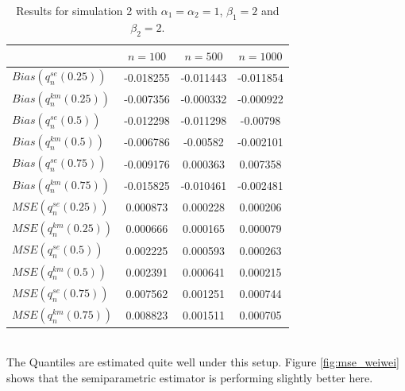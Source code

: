 \begin{table}[h!]
	\begin{center}
		\begin{tabular}{| l || c | c | c |}
			\hline
			&       $n=100$   &    $n=500$    &    $n=1000$\\
			\hline
			\hline
			$Bias(q^{se}_n(0.25)) $ & -0.018255 & -0.011443 & -0.011854\\
			$Bias(q^{km}_n(0.25)) $ & -0.007356 & -0.000332 & -0.000922\\
			\hline
			$Bias(q^{se}_n(0.5)) $ & -0.012298 & -0.011298 & -0.00798\\
			$Bias(q^{km}_n(0.5))$ & -0.006786 & -0.00582 & -0.002101\\
			\hline
			$Bias(q^{se}_n(0.75))$ & -0.009176 & 0.000363 & 0.007358\\
			$Bias(q^{km}_n(0.75))$ & -0.015825 & -0.010461 & -0.002481\\
			\hline
			\hline
			$MSE(q^{se}_n(0.25))$ & 0.000873 & 0.000228 & 0.000206\\
			$MSE(q^{km}_n(0.25))$ & 0.000666 & 0.000165 & 0.000079\\
			\hline
			$MSE(q^{se}_n(0.5))$ & 0.002225 & 0.000593 & 0.000263\\
			$MSE(q^{km}_n(0.5))$ & 0.002391 & 0.000641 & 0.000215\\
			\hline
			$MSE(q^{se}_n(0.75))$ & 0.007562 & 0.001251 & 0.000744\\
			$MSE(q^{km}_n(0.75))$ & 0.008823 & 0.001511 & 0.000705\\
			\hline
		\end{tabular}
	\end{center}
	\caption{Results for simulation 2 with  $\alpha_1 = \alpha_2 = 1$, $\beta_1 = 2$ and $\beta_2 = 2$.}
	\label{tab:res_weiwei2}
\end{table}\\
%
The Quantiles are estimated quite well under this setup. Figure \ref{fig:mse_weiwei} shows that the semiparametric estimator is performing slightly better here.
